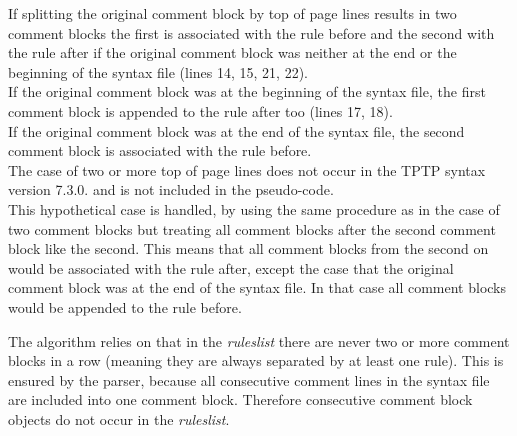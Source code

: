 If splitting the original comment block by top of page lines results in two comment blocks the first is associated with the rule before and the second with the rule after if the original comment block was neither at the end or the beginning of the syntax file (lines 14, 15, 21, 22).\\
If the original comment block was at the beginning of the syntax file, the first comment block is appended to the rule 
after too (lines 17, 18).\\
If the original comment block was at the end of the syntax file, the second comment block is associated with the rule before.\\
The case of two or more top of page lines does not occur in the \ac{TPTP} syntax version 7.3.0. and is not included in the pseudo-code.\\
This hypothetical case is handled, by using the same procedure as in the case of two comment blocks but treating all comment blocks after the second comment block like the second. This means that all comment blocks from the second on would be associated with the rule after, except the case that the original comment block was at the end of the syntax file. In that case all comment blocks would be appended to the rule before.

The algorithm relies on that in the \textit{rules\textunderscore list} there are never two or more comment blocks in a row (meaning they are always separated by at least one rule). This is ensured by the parser, because all consecutive comment lines in the syntax file are included into one comment block. Therefore consecutive comment block objects do not occur in the \textit{rules\textunderscore list}.

